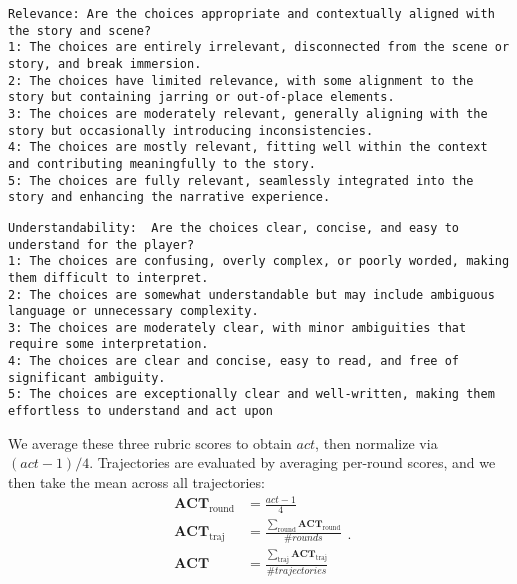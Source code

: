 \begin{center}
\begin{minipage}{0.95\textwidth}
\begin{lstlisting}[language=plaintext, frame=none, numbers=none]
Relevance: Are the choices appropriate and contextually aligned with the story and scene?
1: The choices are entirely irrelevant, disconnected from the scene or story, and break immersion.
2: The choices have limited relevance, with some alignment to the story but containing jarring or out-of-place elements.
3: The choices are moderately relevant, generally aligning with the story but occasionally introducing inconsistencies.
4: The choices are mostly relevant, fitting well within the context and contributing meaningfully to the story.
5: The choices are fully relevant, seamlessly integrated into the story and enhancing the narrative experience.
\end{lstlisting}
\end{minipage}
\end{center}
\begin{center}
\begin{minipage}{0.95\textwidth}
\begin{lstlisting}[language=plaintext, frame=none, numbers=none]
Understandability:  Are the choices clear, concise, and easy to understand for the player?
1: The choices are confusing, overly complex, or poorly worded, making them difficult to interpret.
2: The choices are somewhat understandable but may include ambiguous language or unnecessary complexity.
3: The choices are moderately clear, with minor ambiguities that require some interpretation.
4: The choices are clear and concise, easy to read, and free of significant ambiguity.
5: The choices are exceptionally clear and well-written, making them effortless to understand and act upon
\end{lstlisting}
\end{minipage}
\end{center}

We average these three rubric scores to obtain $act$, then normalize via $(act - 1)/4$. Trajectories are evaluated by averaging per-round scores, and we then take the mean across all trajectories:
\begin{equation}
\begin{aligned}
    \textbf{ACT}_{\text{round}} &= \frac{act-1}{4}\\
    \textbf{ACT}_{\text{traj}} &= \frac{\sum_{\text{round}} \textbf{ACT}_\text{round}}{\# rounds}\\
    \textbf{ACT} &= \frac{\sum_{\text{traj}} \textbf{ACT}_\text{traj}}{\# trajectories}
\end{aligned}.
\end{equation}




